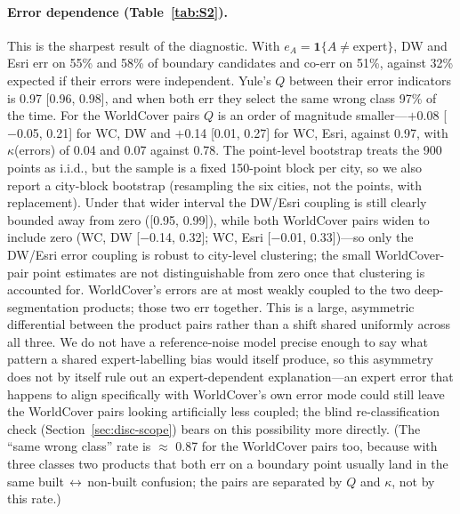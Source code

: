 \documentclass[remotesensing,article,submit,moreauthors]{Definitions/mdpi}
\begin{document}
\paragraph{Error dependence (Table~\ref{tab:S2}).}
This is the sharpest result of the diagnostic. With $e_A = \mathbf{1}\{A \neq
\text{expert}\}$, DW and Esri err on 55\% and 58\% of boundary candidates and
co-err on 51\%, against 32\% expected if their errors were independent. Yule's
$Q$ between their error indicators is 0.97 [0.96, 0.98], and when both err they
select the same wrong class 97\% of the time. For the WorldCover pairs $Q$ is an
order of magnitude smaller---$+$0.08 [$-$0.05, 0.21] for WC, DW and $+$0.14
[0.01, 0.27] for WC, Esri, against 0.97, with $\kappa$(errors) of 0.04 and 0.07
against 0.78. The point-level bootstrap treats the 900 points as i.i.d., but
the sample is a fixed 150-point block per city, so we also report a
city-block bootstrap (resampling the six cities, not the points, with
replacement). Under that wider interval the DW/Esri coupling is still clearly
bounded away from zero ([0.95, 0.99]), while both WorldCover pairs widen to
include zero (WC, DW [$-$0.14, 0.32]; WC, Esri [$-$0.01, 0.33])---so only the
DW/Esri error coupling is robust to city-level clustering; the small
WorldCover-pair point estimates are not distinguishable from zero once that
clustering is accounted for. WorldCover's errors are at most
weakly coupled to the two deep-segmentation products; those two err together.
This is a large, asymmetric differential between the product pairs rather than
a shift shared uniformly across all three. We do not have a reference-noise
model precise enough to say what pattern a shared expert-labelling bias would
itself produce, so this asymmetry does not by itself rule out an
expert-dependent explanation---an expert error that happens to align
specifically with WorldCover's own error mode could still leave the
WorldCover pairs looking artificially less coupled; the blind re-classification
check (Section~\ref{sec:disc-scope}) bears on this possibility more directly. (The ``same wrong class'' rate is $\approx$ 0.87 for
the WorldCover pairs too, because with three classes two products that both err
on a boundary point usually land in the same
built\,$\leftrightarrow$\,non-built confusion; the pairs are separated by $Q$
and $\kappa$, not by this rate.)
\end{document}
